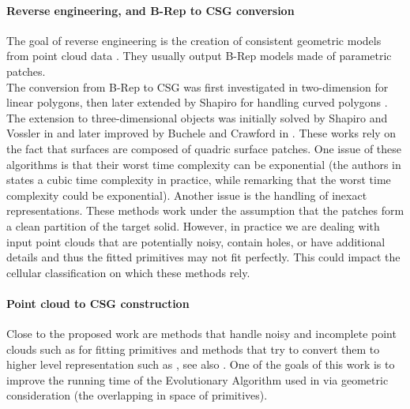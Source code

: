 \paragraph{Reverse engineering, and B-Rep to CSG conversion}
The goal of reverse engineering is the creation of consistent geometric models from point cloud data \cite{VMC97,BMV01}. 
They usually output B-Rep models made of parametric patches.
\\
The conversion from B-Rep to CSG was first investigated in 
two-dimension for linear polygons, then 
later extended by Shapiro for handling curved polygons \cite{shapiro1991efficient, shapiro2001convex}. 
The extension to three-dimensional objects was initially solved 
by Shapiro and Vossler in 
\cite{shapiro1991construction, shapiro1993separation} 
and later improved by 
Buchele and Crawford in \cite{buchele2004three}. 
These works rely on the fact that surfaces are composed of quadric surface patches. 
One issue of these algorithms is that their worst time complexity can be 
exponential (the authors in \cite{buchele2004three} states a cubic 
time complexity in practice, while remarking that the worst time complexity could be exponential). 
Another issue is the handling of inexact representations. 
These methods work under the assumption that the patches form a clean partition of the 
target solid. However, in practice we are dealing with input point clouds that are potentially 
noisy, contain holes, or have additional details and thus the fitted primitives may not fit perfectly. 
This could impact the cellular classification on which these methods rely. 

\paragraph{Point cloud to CSG construction}
Close to the proposed work are methods that handle noisy and incomplete point clouds 
such as \cite{schnabel2007efficient} for fitting primitives and methods that try to convert them to higher level representation such as \cite{fayolle2016evolutionary}, see also \cite[Sections~7 and 8]{berger2017survey}. 
One of the goals of this work is to improve the running time of the Evolutionary Algorithm used in \cite{fayolle2016evolutionary} via geometric consideration (the overlapping in space of primitives).

